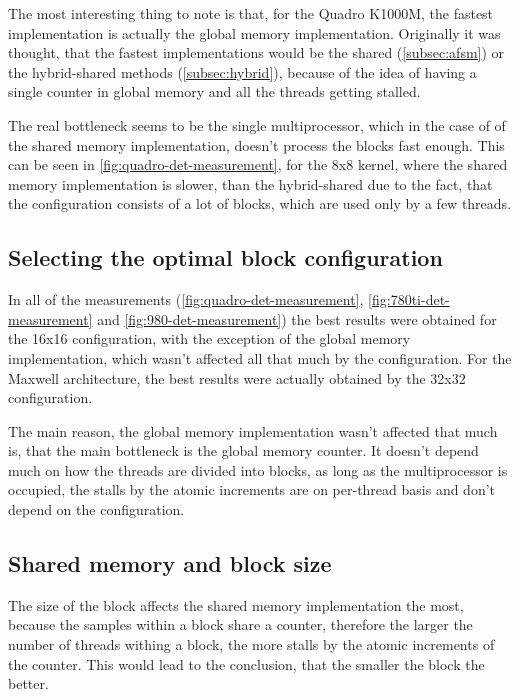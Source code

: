 The most interesting thing to note is that, for the Quadro K1000M, the fastest implementation is actually the global memory implementation. Originally it was thought, that the fastest implementations would be the shared (\ref{subsec:afsm}) or the hybrid-shared methods (\ref{subsec:hybrid}), because of the idea of having a single counter in global memory and all the threads getting stalled. 

The real bottleneck seems to be the single multiprocessor, which in the case of of the shared memory implementation, doesn't process the blocks fast enough. This can be seen in \ref{fig:quadro-det-measurement}, for the 8x8 kernel, where the shared memory implementation is slower, than the hybrid-shared due to the fact, that the configuration consists of a lot of blocks, which are used only by a few threads.

\subsection{Selecting the optimal block configuration}\label{subsec:block-config}

In all of the measurements (\ref{fig:quadro-det-measurement}, \ref{fig:780ti-det-measurement} and \ref{fig:980-det-measurement}) the best results were obtained for the 16x16 configuration, with the exception of the global memory implementation, which wasn't affected all that much by the configuration. For the Maxwell architecture, the best results were actually obtained by the 32x32 configuration.

The main reason, the global memory implementation wasn't affected that much is, that the main bottleneck is the global memory counter. It doesn't depend much on how the threads are divided into blocks, as long as the multiprocessor is occupied, the stalls by the atomic increments are on per-thread basis and don't depend on the configuration.

\subsection{Shared memory and block size}

The size of the block affects the shared memory implementation the most, because the samples within a block share a counter, therefore the larger the number of threads withing a block, the more stalls by the atomic increments of the counter. This would lead to the conclusion, that the smaller the block the better.


